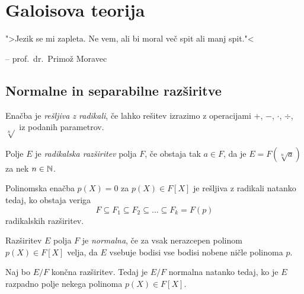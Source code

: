 \section{Galoisova teorija}

\epigraph{">Jezik se mi zapleta. Ne vem, ali bi moral več spit ali
manj spit."<}{-- prof.~dr.~Primož Moravec}

\subsection{Normalne in separabilne razširitve}


\begin{definicija}
Enačba je \emph{rešljiva z radikali}, če
lahko rešitev izrazimo z operacijami $+$, $-$, $\cdot$, $\div$,
$\sqrt[n]{}$ iz podanih parametrov.
\end{definicija}

\begin{definicija}
Polje $E$ je
\emph{radikalska razširitev}
polja $F$, če obstaja tak $a \in F$, da je $E = F(\sqrt[n]{a})$ za
nek $n \in \mathbb{N}$.
\end{definicija}

\begin{opomba}
Polinomska enačba $p(X) = 0$ za $p(X) \in F[X]$ je rešljiva z
radikali natanko tedaj, ko obstaja veriga
\[
F \subseteq F_1 \subseteq F_2 \subseteq \dots \subseteq F_k = F(p)
\]
radikalskih razširitev.
\end{opomba}

\begin{definicija}
Razširitev $E$ polja $F$ je
\emph{normalna}, če za vsak
nerazcepen polinom $p(X) \in F[X]$ velja, da $E$ vsebuje bodisi vse
bodisi nobene ničle polinoma $p$.
\end{definicija}

\begin{izrek}
Naj bo $E/F$ končna razširitev. Tedaj je $E/F$ normalna natanko
tedaj, ko je $E$ razpadno polje nekega polinoma $p(X) \in F[X]$.
\end{izrek}


